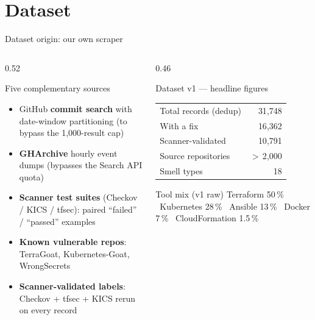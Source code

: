 \documentclass[aspectratio=169, 10pt]{beamer}
\begin{document}
\section{Dataset}

\begin{frame}{Dataset origin: our own scraper}
  \begin{columns}[T]
    \begin{column}{0.52\textwidth}
      \begin{block}{Five complementary sources}
        \scriptsize
        \begin{itemize}
          \item GitHub \textbf{commit search} with date-window
                partitioning (to bypass the 1{,}000-result cap)
          \item \textbf{GHArchive} hourly event dumps
                (bypasses the Search API quota)
          \item \textbf{Scanner test suites} (Checkov / KICS / tfsec):
                paired ``failed'' / ``passed'' examples
          \item \textbf{Known vulnerable repos}:
                TerraGoat, Kubernetes-Goat, WrongSecrets
          \item \textbf{Scanner-validated labels}: Checkov + tfsec +
                KICS rerun on every record
        \end{itemize}
      \end{block}
    \end{column}
    \begin{column}{0.46\textwidth}
      \begin{exampleblock}{Dataset v1 --- headline figures}
        \scriptsize
        \begin{tabular}{@{}lr@{}}
          \toprule
          Total records (dedup)       & 31{,}748 \\
          With a fix                  & 16{,}362 \\
          Scanner-validated           & 10{,}791 \\
          Source repositories         & $>$\,2{,}000 \\
          Smell types                 & 18 \\
          \bottomrule
        \end{tabular}
      \end{exampleblock}
      \begin{block}{Tool mix (v1 raw)}
        \scriptsize
        Terraform 50\,\% \textbullet\ Kubernetes 28\,\% \textbullet\
        Ansible 13\,\% \textbullet\ Docker 7\,\% \textbullet\
        CloudFormation 1.5\,\%
      \end{block}
    \end{column}
  \end{columns}
\end{frame}
\end{document}
